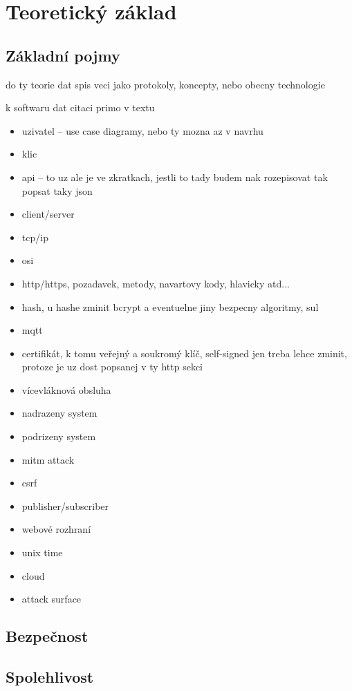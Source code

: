 \chapter{Teoretický základ}
\label{sec:te}

\section{Základní pojmy}

do ty teorie dat spis veci jako protokoly, koncepty, nebo obecny technologie

k softwaru dat citaci primo v textu

\begin{itemize}
    \item uzivatel -- use case diagramy, nebo ty mozna az v navrhu
    \item klic
    \item api -- to uz ale je ve zkratkach, jestli to tady budem nak rozepisovat tak popsat taky json
    \item client/server
    \item tcp/ip
    \item osi
    \item http/https, pozadavek, metody, navartovy kody, hlavicky atd...
    \item hash, u hashe zminit bcrypt a eventuelne jiny bezpecny algoritmy, sul
    \item mqtt
    \item certifikát, k tomu veřejný a soukromý klíč, self-signed jen treba lehce zminit, protoze je uz dost popsanej v ty http sekci
    \item vícevláknová obsluha
    \item nadrazeny system
    \item podrizeny system
    \item mitm attack
    \item csrf
    \item publisher/subscriber
    \item webové rozhraní
    \item unix time
    \item cloud
    \item attack surface
\end{itemize}

\section{Bezpečnost}

\section{Spolehlivost}